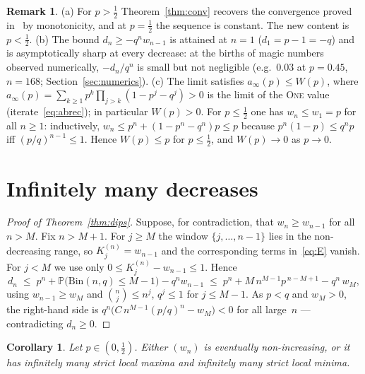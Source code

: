 \documentclass[11pt]{article}
\newtheorem{corollary}[theorem]{Corollary}
\theoremstyle{definition}
\newtheorem{remark}[theorem]{Remark}
\newcommand{\One}{\textsc{One}}
\newcommand{\Bin}{\mathrm{Bin}}
\newcommand{\Prob}{\mathbb{P}}
\begin{document}
\begin{remark}
  (a) For $p>\tfrac12$ Theorem~\ref{thm:conv} recovers the convergence
  proved in~\cite{Paper1} by monotonicity, and at $p=\tfrac12$ the
  sequence is constant.  The new content is $p<\tfrac12$.
  (b) The bound $d_n\ge-q^{n}w_{n-1}$ is attained at $n=1$
  ($d_1=p-1=-q$) and is asymptotically sharp at every decrease: at the
  births of magic numbers observed numerically, $-d_n/q^{n}$ is small
  but not negligible (e.g.\ $0.03$ at $p=0.45$, $n=168$;
  Section~\ref{sec:numerics}).
  (c) The limit satisfies $a_\infty(p)\le W(p)$, where
  $a_\infty(p)=\sum_{k\ge1}p^{k}\prod_{j>k}(1-p^{j}-q^{j})>0$ is the
  limit of the \One{} value (iterate~\eqref{eq:abrec}); in particular
  $W(p)>0$.  For $p\le\tfrac12$ one has $w_n\le w_1=p$ for all $n\ge1$:
  inductively, $w_n\le p^{n}+(1-p^{n}-q^{n})p\le p$ because
  $p^{n}(1-p)\le q^{n}p$ iff $(p/q)^{n-1}\le1$.  Hence
  $W(p)\le p$ for $p\le\tfrac12$, and $W(p)\to0$ as $p\to0$.
\end{remark}

\section{Infinitely many decreases}\label{sec:dips}

\begin{proof}[Proof of Theorem~\ref{thm:dips}]
  Suppose, for contradiction, that $w_n\ge w_{n-1}$ for all $n>M$.
  Fix $n>M+1$.  For $j\ge M$ the window $\{j,\dots,n-1\}$ lies in the
  non-decreasing range, so $K^{(n)}_j=w_{n-1}$ and the corresponding
  terms in~\eqref{eq:E} vanish.  For $j<M$ we use only
  $0\le K^{(n)}_j-w_{n-1}\le1$.  Hence
  \[
    d_n\;\le\;p^{n}+\Prob\bigl(\Bin(n,q)\le M-1\bigr)-q^{n}w_{n-1}
    \;\le\;p^{n}+M\,n^{M-1}p^{\,n-M+1}-q^{n}\,w_M ,
  \]
  using $w_{n-1}\ge w_M$ and $\binom nj\le n^{j}$, $q^{j}\le1$ for
  $j\le M-1$.  As $p<q$ and $w_M>0$, the right-hand side is
  $q^{n}\bigl(C\,n^{M-1}(p/q)^{n}-w_M\bigr)<0$ for all large~$n$ ---
  contradicting $d_n\ge0$.
\end{proof}

\begin{corollary}\label{cor:extrema}
  Let $p\in(0,\tfrac12)$.  Either $(w_n)$ is eventually non-increasing,
  or it has infinitely many strict local maxima and infinitely many
  strict local minima.
\end{corollary}
\end{document}

